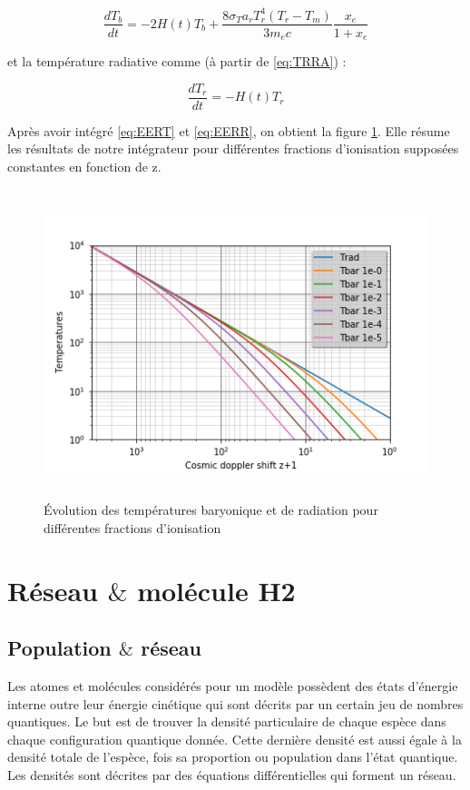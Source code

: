 \documentclass[10pt, a4paper]{report}
\numberwithin{equation}{subsection}
\begin{document}
\begin{equation} \label{eq:EERT}
\boxed{\frac{dT_b}{dt} = -2H(t)T_b+\frac{8\sigma_Ta_rT_r^4(T_r-T_m)}{3m_ec}\frac{x_e}{1+x_e}}
\end{equation}

et la température radiative comme (à partir de \ref{eq:TRRA}) :

\begin{equation} \label{eq:EERR}
\boxed{\frac{dT_r}{dt} = -H(t)T_r}
\end{equation}

Après avoir intégré \ref{eq:EERT} et \ref{eq:EERR}, on obtient la figure \ref{fig:T}. Elle résume les résultats de notre intégrateur pour différentes fractions d’ionisation supposées constantes en fonction de z.

\begin{figure}[]
\centering
\includegraphics[width=12.0cm,height=9cm]{Temperatures.png}
\caption{\uppercase{é}volution des températures baryonique et de radiation pour différentes fractions d'ionisation}
\label{fig:T}
\end{figure}

\section{Réseau $\&$ molécule H2}
\subsection{Population $\&$ réseau}
Les atomes et molécules considérés pour un modèle possèdent des états d'énergie interne outre leur énergie cinétique qui sont décrits par un certain jeu de nombres quantiques. Le but est de trouver la densité particulaire de chaque espèce dans chaque configuration quantique donnée. Cette dernière densité est aussi égale à la densité totale de l'espèce, fois sa proportion ou population dans l'état quantique. Les densités sont décrites par des équations différentielles qui forment un réseau.\bigskip
\large
\end{document}
